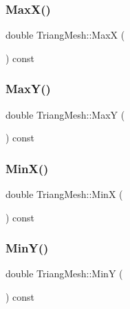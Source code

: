 \subsubsection{\texorpdfstring{Max\+X()}{MaxX()}}
{\footnotesize\ttfamily double Triang\+Mesh\+::\+MaxX (\begin{DoxyParamCaption}{ }\end{DoxyParamCaption}) const\hspace{0.3cm}{\ttfamily [inline]}}

\mbox{\label{structTriangMesh_a0488ee177575bde01db0fd543d873b7a}} 
\subsubsection{\texorpdfstring{Max\+Y()}{MaxY()}}
{\footnotesize\ttfamily double Triang\+Mesh\+::\+MaxY (\begin{DoxyParamCaption}{ }\end{DoxyParamCaption}) const\hspace{0.3cm}{\ttfamily [inline]}}

\mbox{\label{structTriangMesh_a20db4e9b5170193411c4f2add2ed5458}} 
\subsubsection{\texorpdfstring{Min\+X()}{MinX()}}
{\footnotesize\ttfamily double Triang\+Mesh\+::\+MinX (\begin{DoxyParamCaption}{ }\end{DoxyParamCaption}) const\hspace{0.3cm}{\ttfamily [inline]}}

\mbox{\label{structTriangMesh_a521abe5c5037afba47b4e0d307144729}} 
\subsubsection{\texorpdfstring{Min\+Y()}{MinY()}}
{\footnotesize\ttfamily double Triang\+Mesh\+::\+MinY (\begin{DoxyParamCaption}{ }\end{DoxyParamCaption}) const\hspace{0.3cm}{\ttfamily [inline]}}

